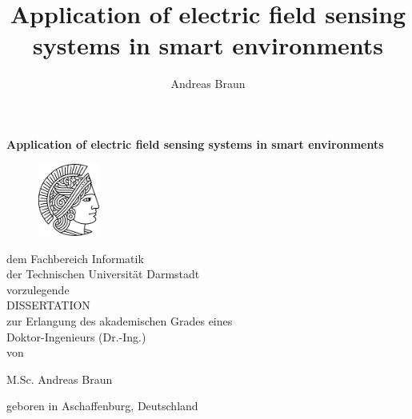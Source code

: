 \title{Application of electric field sensing systems in smart environments}%
\author{Andreas Braun}


\begin{titlepage}

\begin{center}

\vspace*{1.0cm}
\huge {\bf Application of electric field sensing systems in smart environments}
\vfill

\begin{figure}[ht]
    \centering
        \includegraphics[width=2cm]{athene.pdf}
\end{figure}

\vspace*{0.2cm}

\normalsize

dem Fachbereich Informatik \\
der Technischen Universität Darmstadt \\
vorzulegende \\

\vspace*{0.5cm}
\Large{\scshape DISSERTATION} \\
\vspace*{0.5cm}
\normalsize
zur Erlangung des akademischen Grades eines \\
Doktor-Ingenieurs (Dr.-Ing.) \\
von \\

\vspace*{0.3cm}

\Large { M.Sc. Andreas Braun\\}

{\normalsize geboren in Aschaffenburg, Deutschland } %

\normalsize
\vspace*{0.2cm}
\vfill


\end{center}
\end{titlepage}
